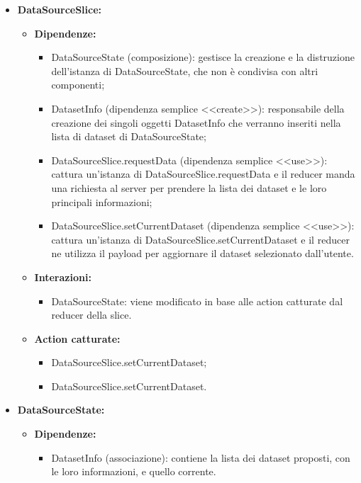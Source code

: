 \begin{itemize}
    \item \textbf{DataSourceSlice:}
    \begin{itemize}
        \item \textbf{Dipendenze:}
        \begin{itemize}
            \item DataSourceState (composizione): gestisce la creazione e la distruzione dell'istanza di DataSourceState, che non è condivisa con altri componenti;
            \item DatasetInfo (dipendenza semplice <<create>>): responsabile della creazione dei singoli oggetti DatasetInfo che verranno inseriti nella lista di dataset di DataSourceState;
            \item DataSourceSlice.requestData (dipendenza semplice <<use>>): cattura un'istanza di DataSourceSlice.requestData e il reducer manda una richiesta al server per prendere la lista dei dataset e le loro principali informazioni;
            \item DataSourceSlice.setCurrentDataset (dipendenza semplice <<use>>): cattura un'istanza di DataSourceSlice.setCurrentDataset e il reducer ne utilizza il payload per aggiornare il dataset selezionato dall'utente.
        \end{itemize} 
        \item \textbf{Interazioni:}
        \begin{itemize}
            \item DataSourceState: viene modificato in base alle action catturate dal reducer della slice.
        \end{itemize} 
        \item \textbf{Action catturate:}
        \begin{itemize}
            \item DataSourceSlice.setCurrentDataset;
            \item DataSourceSlice.setCurrentDataset.
        \end{itemize} 
    \end{itemize}

    
    \item \textbf{DataSourceState:}
    \begin{itemize}
        \item \textbf{Dipendenze:}
        \begin{itemize}
            \item DatasetInfo (associazione): contiene la lista dei dataset proposti, con le loro informazioni, e quello corrente.
        \end{itemize} 
    \end{itemize}


\end{itemize}
